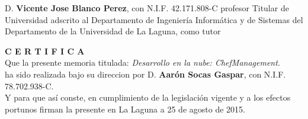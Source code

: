 \documentclass[a4paper,14pt]{book}
\begin{document}
	
	D. \textbf{Vicente Jose Blanco Perez}, con N.I.F. 42.171.808-C profesor Titular	de Universidad adscrito al Departamento de Ingeniería Informática y de Sistemas	del Departamento de la Universidad de La Laguna, como tutor \\
	\vspace*{0.6in}

	\textbf{C E R T I F I C A} \\

	\vspace*{0.1in}
	Que la presente memoria titulada: \emph{Desarrollo en la nube: ChefManagement}. \\

	\vspace*{0.1in}
	ha sido realizada bajo su direccion por D. \textbf{Aarón Socas Gaspar},	con N.I.F. 78.702.938-C. \\

	\vspace*{0.1in}
	Y para que así conste, en cumplimiento de la legislación vigente y a los efectos portunos firman la presente en La Laguna a 25 de agosto de 2015. 
\end{document}
